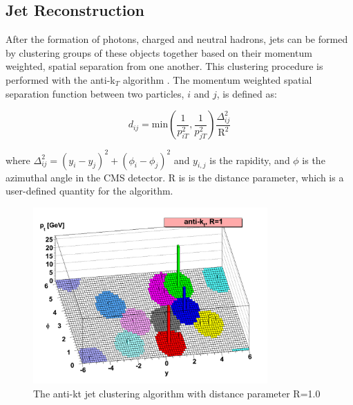 \subsection{Jet Reconstruction}
\label{jet_reco_overview}

\par After the formation of photons, charged and neutral hadrons, jets
can be formed by clustering groups of these objects together based on
their momentum weighted, spatial separation from one another.  This
clustering procedure is performed with the anti-k$_{T}$ algorithm
\cite{Cacciari:2008gp}.   The momentum weighted spatial separation
function between two particles, $i$ and $j$, is defined as:

\begin{equation}\label{eq:antiKt_d}
d_{ij} = \text{min}(\frac{1}{p_{iT}^{2}},
\frac{1}{p_{jT}^{2}})\frac{\Delta_{ij}^{2}}{\text{R}^{2}}
\end{equation}

\noindent where $\Delta_{ij}^{2} =
(y_{i}-y_{j})^{2}+(\phi_{i}-\phi_{j})^{2}$ and $y_{i,j}$ is the
rapidity, and $\phi$ is the azimuthal angle in the CMS detector.  R is
is the distance parameter, which is a user-defined quantity for the
algorithm.  

\begin{figure}[h]
   \centering
  \includegraphics[width=0.8\textwidth]{Figures/Reconstruction_Diagrams/Jets__AntiKt_Algo.pdf}
  \caption{The anti-kt jet clustering algorithm with distance
    parameter R=1.0} \label{fig:antiKt}
\end{figure}

